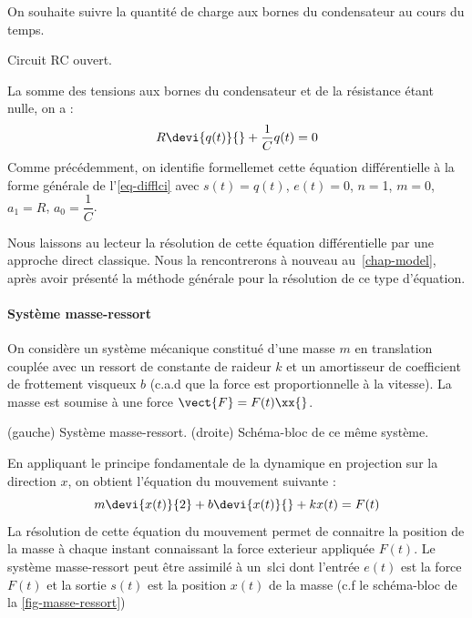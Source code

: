 On souhaite suivre la quantité de charge aux bornes du condensateur au 
cours du temps.
\begin{marginfigure}[-8em]   
    \centering
    
    \caption{Circuit RC ouvert.\label{fig-decharge_condensateur}}
\end{marginfigure}
La somme des tensions aux bornes du condensateur et de la résistance 
étant nulle, on a :
\begin{align*}
    R\devi{q(t)}{}+\dfrac{1}{C}q(t)=0 
\end{align*}
Comme précédemment, on identifie formellemet cette équation différentielle 
à la forme générale de l'\cref{eq-difflci} avec $s(t)=q(t)$, $e(t)=0$, 
$n=$1, $m=0$, $a_1=R$, $a_0=\dfrac{1}{C}$.

Nous laissons au lecteur la résolution de cette équation différentielle 
par une approche direct classique.
Nous la rencontrerons à nouveau au~\cref{chap-model}, après avoir 
présenté la méthode générale pour la résolution de ce type d'équation.
\paragraph{Système masse-ressort}
On considère un système mécanique constitué d'une masse $m$ en translation 
couplée avec un ressort de constante
de raideur $k$ et un amortisseur de coefficient de frottement 
visqueux $b$ (c.a.d que la force est 
proportionnelle à la vitesse). 
La masse est soumise à une force $\vect{F}=F(t)\xx{}$.
\begin{marginfigure}[-8em]
    \centering
    
    \caption{(gauche) Système masse-ressort. (droite) Schéma-bloc de ce même 
    système.
    \label{fig-masse-ressort}}
\end{marginfigure}
En appliquant le principe fondamentale de la dynamique en projection 
sur la direction $x$, on obtient l'équation du mouvement suivante :
\[
m\devi{x(t)}{2}+b\devi{x(t)}{}+kx(t)=F(t)
\]
\newpage
\restoregeometry
La résolution de cette équation du mouvement permet de connaitre la position 
de la masse à chaque instant connaissant la force exterieur 
appliquée $F(t)$. Le système masse-ressort peut être assimilé à un~\gls{slci} 
dont l'entrée $e(t)$ est la force $F(t)$ et la sortie $s(t)$ est la 
position $x(t)$ de la masse (c.f le schéma-bloc de la \cref{fig-masse-ressort})

